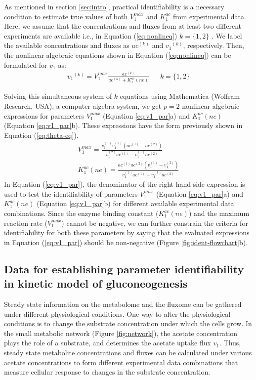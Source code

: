 \documentclass[10pt]{article}
\begin{document}
	As mentioned in section \ref{sec:intro}, practical identifiability is a necessary condition to estimate true values of both $V_1^{max}$ and $K_1^{ac}$ from experimental data. Here, we assume that the concentrations and fluxes from at least two different experiments are available i.e., in Equation (\ref{eq:nonlineq}) $k = \{1, 2\}$ . We label the available concentrations and fluxes as ${ac}^{(k)}$ and ${v_1}^{(k)}$, respectively. Then, the nonlinear algebraic equations shown in Equation (\ref{eq:nonlineq}) can be formulated for $v_1$ as:
	\begin{align}\label{eq:nonlin-flux2}
	{v_1}^{(k)} = V_{1}^{max}\frac{ac^{(k)}}{ac^{(k)}+K_{1}^{ac}(ne)} &&  k=\{1, 2\}
	\end{align}
	
	Solving this simultaneous system of $k$ equations using Mathematica (Wolfram Research, USA), a computer algebra system, we get $p=2$ nonlinear algebraic expressions for parameters $V_1^{max}$ (Equation \ref{eq:v1_par}a) and $K_1^{ac}(ne)$ (Equation \ref{eq:v1_par}b). These expressions have the form previously shown in Equation (\ref{eq:theta-eq}).
	\begin{subequations}\label{eq:v1_par}
		\begin{align}		
		V_1^{max} = \frac{v_1^{(1)}v_1^{(2)}(ac^{(1)}-ac^{(2)})}{v_1^{(2)}ac^{(1)}-v_1^{(1)}ac^{(2)}}\\
		K_1^{ac}(ne) = \frac{ac^{(1)}ac^{(2)}(v_1^{(1)}-v_1^{(2)})}{v_1^{(2)}ac^{(1)}-v_1^{(1)}ac^{(2)}}
		\end{align}
	\end{subequations}
	In Equation (\ref{eq:v1_par}), the denominator of the right hand side expression is used to test the identifiability of parameters $V_1^{max}$ (Equation \ref{eq:v1_par}a) and $K_1^{ac}(ne)$ (Equation \ref{eq:v1_par}b) for different available experimental data combinations. Since the enzyme binding constant ($K_1^{ac}(ne)$) and the maximum reaction rate ($V_1^{max}$) cannot be negative, we can further constrain the criteria for identifiability for both these parameters by saying that the evaluated expressions in Equation (\ref{eq:v1_par}) should be non-negative (Figure \ref{fig:ident-flowchart}b). 	
	
	\subsection{Data for establishing parameter identifiability in kinetic model of gluconeogenesis}\label{sec:experiments}
	Steady state information on the metabolome and the fluxome can be gathered under different physiological conditions. One way to alter the physiological conditions is to change the substrate concentration under which the cells grow. In the small metabolic network (Figure \ref{fig:network}), the acetate concentration plays the role of a substrate, and  determines the acetate uptake flux $v_1$. Thus, steady state metabolite concentrations and fluxes can be calculated under various acetate concentrations to form different experimental data combinations that measure cellular response to changes in the substrate concentration. 
	
\end{document}
